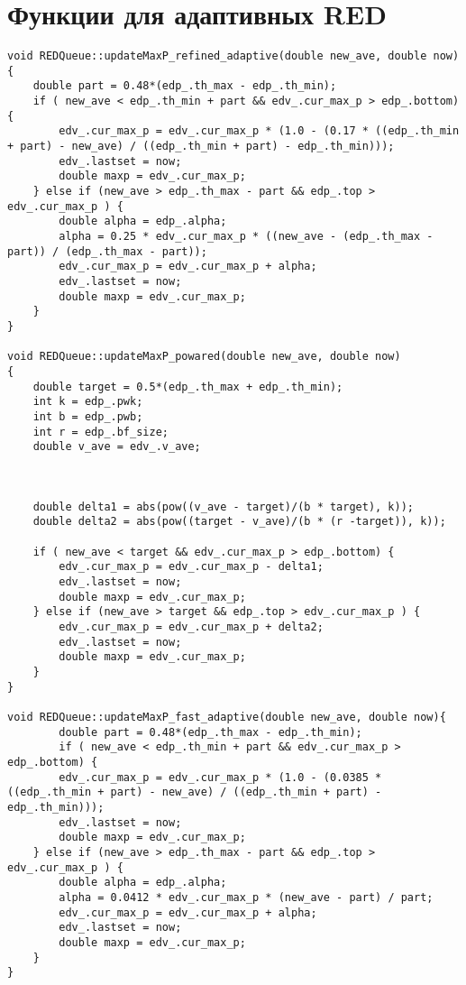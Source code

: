 \section{Функции для адаптивных RED}
\begin{verbatim}
void REDQueue::updateMaxP_refined_adaptive(double new_ave, double now)
{
  	double part = 0.48*(edp_.th_max - edp_.th_min);
 	if ( new_ave < edp_.th_min + part && edv_.cur_max_p > edp_.bottom) {
 		edv_.cur_max_p = edv_.cur_max_p * (1.0 - (0.17 * ((edp_.th_min + part) - new_ave) / ((edp_.th_min + part) - edp_.th_min))); 
 		edv_.lastset = now;
 		double maxp = edv_.cur_max_p;
 	} else if (new_ave > edp_.th_max - part && edp_.top > edv_.cur_max_p ) {
 		double alpha = edp_.alpha;
 		alpha = 0.25 * edv_.cur_max_p * ((new_ave - (edp_.th_max - part)) / (edp_.th_max - part));
 		edv_.cur_max_p = edv_.cur_max_p + alpha;
 		edv_.lastset = now;
 		double maxp = edv_.cur_max_p;
 	}
}

void REDQueue::updateMaxP_powared(double new_ave, double now)
{
  	double target = 0.5*(edp_.th_max + edp_.th_min);
  	int k = edp_.pwk;
  	int b = edp_.pwb;
  	int r = edp_.bf_size;
  	double v_ave = edv_.v_ave;
  	
  	
  	
  	double delta1 = abs(pow((v_ave - target)/(b * target), k));
  	double delta2 = abs(pow((target - v_ave)/(b * (r -target)), k));
 	
 	if ( new_ave < target && edv_.cur_max_p > edp_.bottom) {
 		edv_.cur_max_p = edv_.cur_max_p - delta1; 
 		edv_.lastset = now;
 		double maxp = edv_.cur_max_p; 
 	} else if (new_ave > target && edp_.top > edv_.cur_max_p ) {
 		edv_.cur_max_p = edv_.cur_max_p + delta2;
 		edv_.lastset = now;
 		double maxp = edv_.cur_max_p;
 	}
}

void REDQueue::updateMaxP_fast_adaptive(double new_ave, double now){
	  	double part = 0.48*(edp_.th_max - edp_.th_min);
		if ( new_ave < edp_.th_min + part && edv_.cur_max_p > edp_.bottom) {
 		edv_.cur_max_p = edv_.cur_max_p * (1.0 - (0.0385 * ((edp_.th_min + part) - new_ave) / ((edp_.th_min + part) - edp_.th_min))); 
 		edv_.lastset = now;
 		double maxp = edv_.cur_max_p;
 	} else if (new_ave > edp_.th_max - part && edp_.top > edv_.cur_max_p ) {
 		double alpha = edp_.alpha;
 		alpha = 0.0412 * edv_.cur_max_p * (new_ave - part) / part;
 		edv_.cur_max_p = edv_.cur_max_p + alpha;
 		edv_.lastset = now;
 		double maxp = edv_.cur_max_p;
 	}
}
\end{verbatim}

